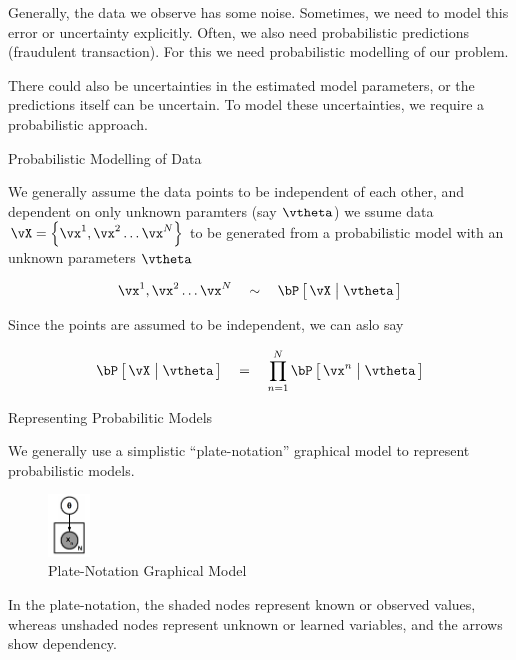 \documentclass{article}
\begin{document}
\makeheader

Generally, the data we observe has some noise. Sometimes, we need to model this error or uncertainty explicitly. Often, we also need probabilistic predictions (fraudulent transaction). For this we need probabilistic modelling of our problem. \br

There could also be uncertainties in the estimated model parameters, or the predictions itself can be uncertain. To model these uncertainties, we require a probabilistic approach.

\begin{ssection}{Probabilistic Modelling of Data}

	We generally assume the data points to be independent of each other, and dependent on only unknown paramters (say $\vtheta$)  we ssume data $\vX = \set{\vx^1, \vx^2 \dots \vx^N}$ to be generated from a probabilistic model with an unknown parameters $\vtheta$

	\begin{align*}
		\vx^1, \vx^2 \dots \vx^N	\qsim	\prob{\vX \pipe \vtheta}
	\end{align*}

	Since the points are assumed to be independent, we can aslo say

	\begin{align*}
		\prob{\vX \pipe \vtheta}	\eq	\prod_{n = 1}^N \prob{\vx^n \pipe \vtheta}
	\end{align*}

	\begin{ssubsection}{Representing Probabilitic Models}

		We generally use a simplistic ``plate-notation'' graphical model to represent probabilistic models.

		\begin{figure}[h!]
			\centering
			\includegraphics[width=0.1\textwidth]{includes/scribe01/plate-graphical-model.png}
			\caption{Plate-Notation Graphical Model}
			\label{fig:plate-model}
		\end{figure}

		In the plate-notation, the shaded nodes represent known or observed values, whereas unshaded nodes represent unknown or learned variables, and the arrows show dependency. \br


\end{ssubsection}
\end{ssection}
\end{document}
